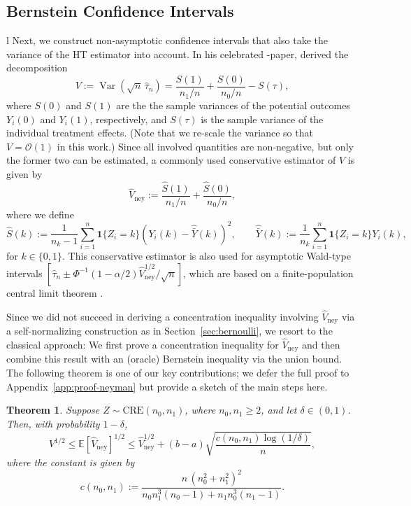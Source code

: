 \documentclass[aos]{imsart2}
\theoremstyle{plain}
\newtheorem{theorem}{Theorem}[section]
\theoremstyle{definition}
\newcommand{\one}{\mathbf{1}}
\newcommand{\E}{\mathbb{E}}
\newcommand{\ybh}{\hat{\bar{Y}}}
\newcommand{\sh}{\hat{S}}
\newcommand{\vhn}{\hat{V}_{\mathrm{ney}}}
\newcommand{\tauh}{\hat{\tau}}
\newcommand{\cre}{\mathrm{CRE}}
\DeclareMathOperator{\var}{Var}
\begin{document}
\subsection{Bernstein Confidence Intervals}l\label{sec:bernstein} Next, we construct non-asymptotic confidence intervals that also take the variance of the HT estimator into account. In his celebrated \citeyear{splawa-neyman_application_1990}-paper, \citeauthor{splawa-neyman_application_1990} derived the decomposition
\begin{equation*}
	V:= \var(\sqrt{n}\,\tauh_n) = \frac{S(1)}{n_1/n} + \frac{S(0)}{n_0/n} - S(\tau),
\end{equation*}
where $S(0)$ and $S(1)$ are the the sample variances of the potential outcomes $Y_i(0)$ and $Y_i(1)$, respectively, and $S(\tau)$ is the sample variance of the individual treatment effects. (Note that we re-scale the variance so that $V=\mathcal{O}(1)$ in this work.)
Since all involved quantities are non-negative, but only the former two can be estimated, a commonly used conservative estimator of $V$ is given by
\begin{equation}\label{eq:var-ney}
	\vhn := \frac{\sh(1)}{n_1/n} + \frac{\sh(0)}{n_0/n},
\end{equation}
where we define
\begin{equation*}
	\sh(k) := \frac{1}{n_k-1} \sum_{i=1}^n \one\{Z_i=k\} (Y_i(k) - \ybh(k))^2,\qquad
	\ybh(k) := \frac{1}{n_k} \sum_{i=1}^n \one\{Z_i=k\} Y_i(k),
\end{equation*}
for $k \in \{0,1\}$. This conservative estimator is also used for asymptotic Wald-type intervals $[\tauh_n \pm \Phi^{-1}(1-\alpha/2)\vhn^{1/2}/\sqrt{n}]$, which are based on a finite-population central limit theorem \citep{li_general_2017}.

Since we did not succeed in deriving a concentration inequality involving $\vhn$ via a self-normalizing construction as in Section~\ref{sec:bernoulli}, we resort to the classical approach: We first prove a concentration inequality for $\vhn$ and then combine this result with an (oracle) Bernstein inequality via the union bound. The following theorem is one of our key contributions; we defer the full proof to Appendix~\ref{app:proof-neyman} but provide a sketch of the main steps here.

\begin{theorem}\label{thm:neyman-conc}
 Suppose $Z \sim \cre(n_0, n_1)$, where $n_0,n_1 \geq 2$, and let $\delta \in (0,1)$. Then, with probability $1-\delta$,
\begin{equation*}
    V^{1/2} \leq \E[\vhn]^{1/2} \leq \vhn^{1/2} + (b-a) \sqrt{\frac{c(n_0,n_1)\log(1/\delta)}{n}},
\end{equation*}
where the constant is given by
\begin{equation*}
    c(n_0,n_1) := \frac{n\,(n_0^2+n_1^2)^2}{n_0n_1^3(n_0-1) + n_1 n_0^3(n_1-1)}.%
\end{equation*}
\end{theorem}
\end{document}

